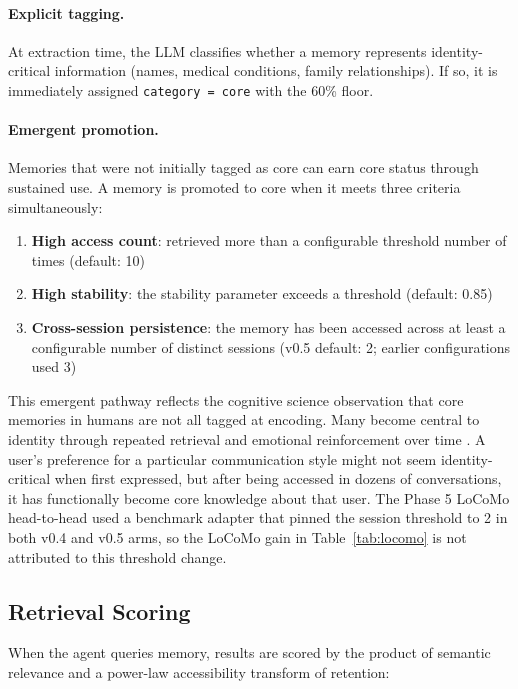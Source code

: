 \documentclass[11pt,a4paper]{article}
\begin{document}
\paragraph{Explicit tagging.} At extraction time, the LLM classifies whether a memory represents identity-critical information (names, medical conditions, family relationships). If so, it is immediately assigned \texttt{category = core} with the 60\% floor.

\paragraph{Emergent promotion.} Memories that were not initially tagged as core can earn core status through sustained use. A memory is promoted to core when it meets three criteria simultaneously:

\begin{enumerate}
    \item \textbf{High access count}: retrieved more than a configurable threshold number of times (default: 10)
    \item \textbf{High stability}: the stability parameter exceeds a threshold (default: 0.85)
    \item \textbf{Cross-session persistence}: the memory has been accessed across at least a configurable number of distinct sessions (v0.5 default: 2; earlier configurations used 3)
\end{enumerate}

This emergent pathway reflects the cognitive science observation that core memories in humans are not all tagged at encoding. Many become central to identity through repeated retrieval and emotional reinforcement over time \citep{bjork1992new}. A user's preference for a particular communication style might not seem identity-critical when first expressed, but after being accessed in dozens of conversations, it has functionally become core knowledge about that user. The Phase 5 LoCoMo head-to-head used a benchmark adapter that pinned the session threshold to 2 in both v0.4 and v0.5 arms, so the LoCoMo gain in Table~\ref{tab:locomo} is not attributed to this threshold change.

\subsection{Retrieval Scoring}

When the agent queries memory, results are scored by the product of semantic relevance and a power-law accessibility transform of retention:
\end{document}
